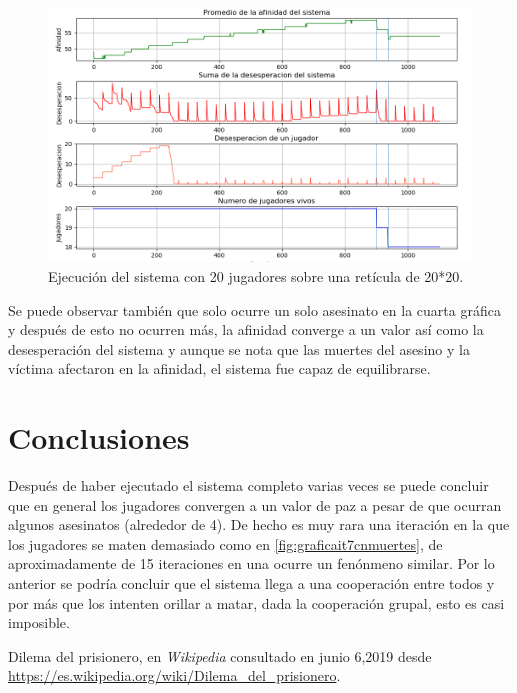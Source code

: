 \documentclass[11pt,letterpaper]{article}
\begin{document}
\begin{figure}[h!]
	\centering
	\includegraphics[width=0.7\linewidth]{Graficas_It_6cnMuertes}
	\caption{Ejecución del sistema con 20 jugadores sobre una retícula de 20*20.}
	\label{fig:graficasit6cnmuertes}
\end{figure}

Se puede observar también que solo ocurre un solo asesinato en la cuarta gráfica y 
después de esto no ocurren más, la afinidad converge a un valor así como la 
desesperación del sistema y aunque se nota que las muertes del asesino y la víctima
afectaron en la afinidad, el sistema fue capaz de equilibrarse.
 
\section{Conclusiones}

Después de haber ejecutado el sistema completo varias veces se puede concluir que en
general los jugadores convergen a un valor de paz a pesar de que ocurran algunos 
asesinatos (alrededor de 4). De hecho es muy rara una iteración en la que los 
jugadores se maten demasiado como en \ref{fig:graficait7cnmuertes}, de 
aproximadamente de 15 iteraciones en una ocurre un fenónmeno similar. Por lo 
anterior se podría concluir que el sistema llega a una cooperación entre todos y 
por más que los intenten orillar a matar, dada la cooperación grupal, esto es casi
imposible.


\begin{thebibliography}{7}
	
	Dilema del prisionero, en \emph{Wikipedia} consultado en junio 6,2019 desde \url{https://es.wikipedia.org/wiki/Dilema_del_prisionero}. 
\end{thebibliography} 
\end{document}
